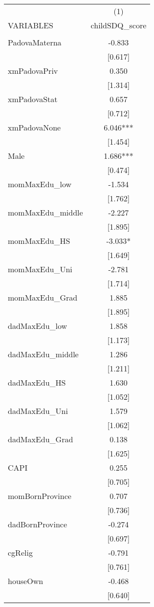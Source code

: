 \documentclass[]{article}
\begin{document}
\begin{tabular}{lc} \hline
 & (1) \\
VARIABLES & childSDQ\_score \\ \hline
 &  \\
PadovaMaterna & -0.833 \\
 & [0.617] \\
xmPadovaPriv & 0.350 \\
 & [1.314] \\
xmPadovaStat & 0.657 \\
 & [0.712] \\
xmPadovaNone & 6.046*** \\
 & [1.454] \\
Male & 1.686*** \\
 & [0.474] \\
momMaxEdu\_low & -1.534 \\
 & [1.762] \\
momMaxEdu\_middle & -2.227 \\
 & [1.895] \\
momMaxEdu\_HS & -3.033* \\
 & [1.649] \\
momMaxEdu\_Uni & -2.781 \\
 & [1.714] \\
momMaxEdu\_Grad & 1.885 \\
 & [1.895] \\
dadMaxEdu\_low & 1.858 \\
 & [1.173] \\
dadMaxEdu\_middle & 1.286 \\
 & [1.211] \\
dadMaxEdu\_HS & 1.630 \\
 & [1.052] \\
dadMaxEdu\_Uni & 1.579 \\
 & [1.062] \\
dadMaxEdu\_Grad & 0.138 \\
 & [1.625] \\
CAPI & 0.255 \\
 & [0.705] \\
momBornProvince & 0.707 \\
 & [0.736] \\
dadBornProvince & -0.274 \\
 & [0.697] \\
cgRelig & -0.791 \\
 & [0.761] \\
houseOwn & -0.468 \\
 & [0.640] \\

\end{tabular}
\end{document}

